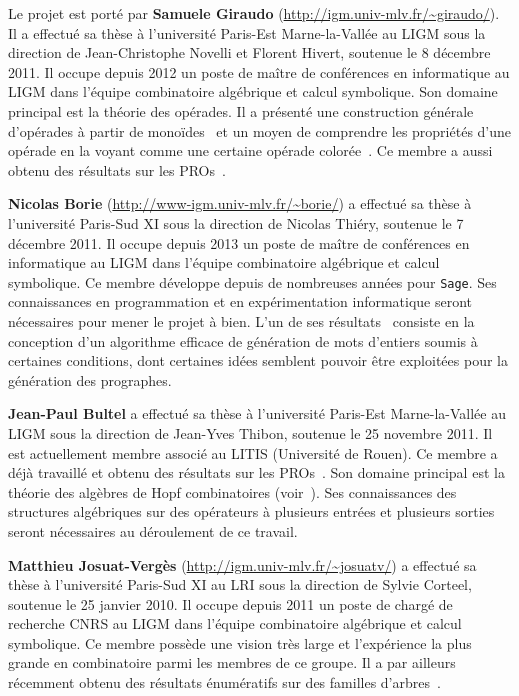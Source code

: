 \documentclass[10pt,reqno]{amsart}
\numberwithin{equation}{subsection}
\begin{document}
Le projet est porté par {\bf Samuele Giraudo}
(\url{http://igm.univ-mlv.fr/~giraudo/}). Il a effectué sa thèse à
l'université Paris-Est Marne-la-Vallée au LIGM sous la direction de
Jean-Christophe Novelli et Florent Hivert, soutenue le 8 décembre 2011.
Il occupe depuis 2012 un poste de maître de conférences en informatique
au LIGM dans l'équipe combinatoire algébrique et calcul symbolique. Son
domaine principal est la théorie des opérades. Il a présenté
une construction générale d'opérades à partir de monoïdes~\cite{Gir15} 
et un moyen de comprendre les propriétés d'une opérade en la voyant 
comme une certaine opérade colorée~\cite{CG14}. Ce membre a aussi obtenu 
des résultats sur les PROs~\cite{BG14}. 


{\bf Nicolas Borie} (\url{http://www-igm.univ-mlv.fr/~borie/}) a effectué
sa thèse à l'université Paris-Sud XI sous la direction de Nicolas
Thiéry, soutenue le 7 décembre 2011. Il occupe depuis 2013 un poste de
maître de conférences en informatique au LIGM dans l'équipe combinatoire
algébrique et calcul symbolique. Ce membre développe depuis de nombreuses
années pour \texttt{Sage}. Ses connaissances en programmation et en
expérimentation informatique seront nécessaires pour mener le projet à
bien. L'un de ses résultats~\cite{Bor13} consiste en la conception d'un
algorithme efficace de génération de mots d'entiers soumis à certaines
conditions, dont certaines idées semblent pouvoir être exploitées pour
la génération des prographes. 


{\bf Jean-Paul Bultel} a effectué sa thèse à l'université Paris-Est
Marne-la-Vallée au LIGM sous la direction de Jean-Yves Thibon, soutenue
le 25 novembre 2011. Il est actuellement membre associé au LITIS 
(Université de Rouen). Ce membre a déjà travaillé et obtenu des
résultats sur les PROs~\cite{BG14}. Son domaine principal est la théorie
des algèbres de Hopf combinatoires (voir~\cite{Bul11}). Ses connaissances
des structures algébriques sur des opérateurs à plusieurs entrées et
plusieurs sorties seront nécessaires au déroulement de ce travail.

{\bf Matthieu Josuat-Vergès} (\url{http://igm.univ-mlv.fr/~josuatv/})
a effectué sa thèse à l'université Paris-Sud XI au LRI sous la
direction de Sylvie Corteel, soutenue le 25 janvier 2010. Il occupe
depuis 2011 un poste de chargé de recherche CNRS au LIGM dans l'équipe
combinatoire algébrique et calcul symbolique. Ce membre possède une
vision très large et l'expérience la plus grande en combinatoire parmi
les membres de ce groupe. Il a par ailleurs récemment obtenu des
résultats énumératifs sur des familles d'arbres~\cite{JV15}. 
\end{document}
